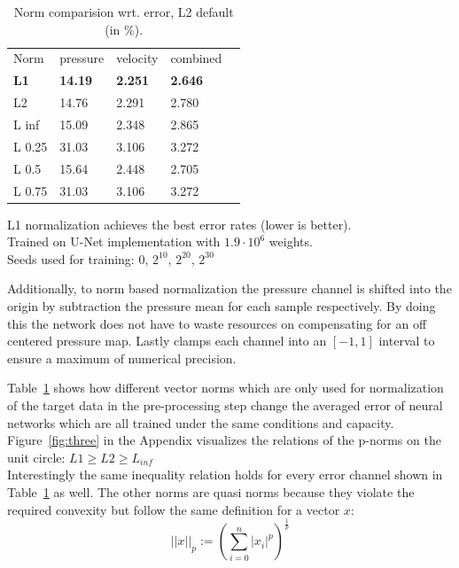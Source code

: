 \documentclass[acmtog]{techreportacmart}
\begin{document}
\begin{table}
\caption{Norm comparision wrt. error, L2 default (in \%).}
\label{tab:one}
\begin{center}
\begin{tabular}{l|l|l|l|l}
  \toprule
  Norm   & pressure   &	velocity    & combined \\
  \bf L1	 & \bf 14.19	  & \bf 2.251		& \bf 2.646    \\
  L2	 & 14.76	  & 2.291		& 2.780	   \\
  L inf	 & 15.09	  & 2.348		& 2.865	   \\
  L 0.25 & 31.03	  & 3.106		& 3.272	   \\
  L 0.5  & 15.64	  & 2.448		& 2.705	   \\
  L 0.75 & 31.03	  & 3.106		& 3.272	   \\	
  \bottomrule
\end{tabular}
\end{center}
\bigskip\centering
\footnotesize L1 normalization achieves the best error rates (lower is better). \\
Trained on \cite{Thuerey20} U-Net implementation with $1.9 \cdot 10^{6}$ weights. \\
Seeds used for training: $0$, $2^{10}$, $2^{20}$, $2^{30}$
\end{table}%
Additionally, to norm based normalization the pressure channel is shifted into the origin by subtraction the pressure mean for each sample respectively. By doing this the network does not have to waste resources on compensating for an off centered pressure map. Lastly \cite{Thuerey20} clamps each channel into an $[-1, 1]$ interval to ensure a maximum of numerical precision.



Table~\ref{tab:one} shows how different vector norms which are only used for normalization of the target data in the pre-processing step change the averaged error of neural networks which are all trained under the same conditions and capacity. Figure~\ref{fig:three} in the Appendix visualizes the relations of the p-norms on the unit circle: $L1 \geq L2 \geq L_{inf}$\\
Interestingly the same inequality relation holds for every error channel shown in Table~\ref{tab:one} as well. The other norms are quasi norms because they violate the required convexity but follow the same definition for a vector $x$:
\begin{equation}
\label{eqn:01}
||x||_p := {\left( \sum_{i=0}^{n} |x_i|^p \right)}^{\frac{1}{p}}
\end{equation}
\end{document}
